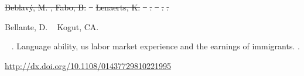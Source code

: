 \documentclass[12pt, a4paper]{article}
\providecommand{\DIFdeltex}[1]{{\protect\color{red}\sout{#1}}}                      %
\providecommand{\DIFdelbegin}{} %
\providecommand{\DIFdelend}{} %
\providecommand{\DIFdel}[1]{\texorpdfstring{\DIFdeltex{#1}}{}} %
\newcommand{\DIFscaledelfig}{0.5}
\newlength{\DIFdelgraphicswidth} %
\newlength{\DIFdelgraphicsheight} %
\newcommand{\DIFdelincludegraphics}[2][]{%
\sbox{\DIFdelgraphicsbox}{\DIFOincludegraphics[#1]{#2}}%
\settoboxwidth{\DIFdelgraphicswidth}{\DIFdelgraphicsbox} %
\settoboxtotalheight{\DIFdelgraphicsheight}{\DIFdelgraphicsbox} %
\scalebox{\DIFscaledelfig}{%
\parbox[b]{\DIFdelgraphicswidth}{\usebox{\DIFdelgraphicsbox}\\[-\baselineskip] \rule{\DIFdelgraphicswidth}{0em}}\llap{\resizebox{\DIFdelgraphicswidth}{\DIFdelgraphicsheight}{%
\setlength{\unitlength}{\DIFdelgraphicswidth}%
\begin{picture}(1,1)%
\thicklines\linethickness{2pt} %
{\color[rgb]{1,0,0}\put(0,0){\framebox(1,1){}}}%
{\color[rgb]{1,0,0}\put(0,0){\line( 1,1){1}}}%
{\color[rgb]{1,0,0}\put(0,1){\line(1,-1){1}}}%
\end{picture}%
}\hspace*{3pt}}} %
} %
\DeclareRobustCommand{\DIFdelbegin}{\DIFOdelbegin \let\includegraphics\DIFdelincludegraphics} %
\DeclareRobustCommand{\DIFdelend}{\DIFOaddend \let\includegraphics\DIFOincludegraphics} %
\begin{document}
\begin{thebibliography}{}
\DIFdelbegin %
\DIFdel{Beblavý, M.%
, Fabo, B.%
}%
\DIFdel{\ }%
\DIFdel{Lenaerts, K.%
}%
\DIFdel{\
}%
\DIFdel{.
}%
\DIFdel{\ }%
\DIFdel{.
}%
\DIFdel{.
}%

\DIFdelend {}
%
\begin{APACrefauthors}%
Bellante, D.%
\BCBT {}\ \BBA {} Kogut, C\BPBI A.%
\end{APACrefauthors}%
\unskip\
\newblock
{}.
\newblock
{\BBOQ} {Language ability, us labor market experience and the
  earnings of immigrants}.{\BBCQ}
\newblock
{}.
\newblock
\begin{APACrefURL} \url{http://dx.doi.org/10.1108/01437729810221995}
  \end{APACrefURL}
\newblock
\begin{APACrefDOI}  \end{APACrefDOI}
\PrintBackRefs{\CurrentBib}


\end{thebibliography}
\end{document}
